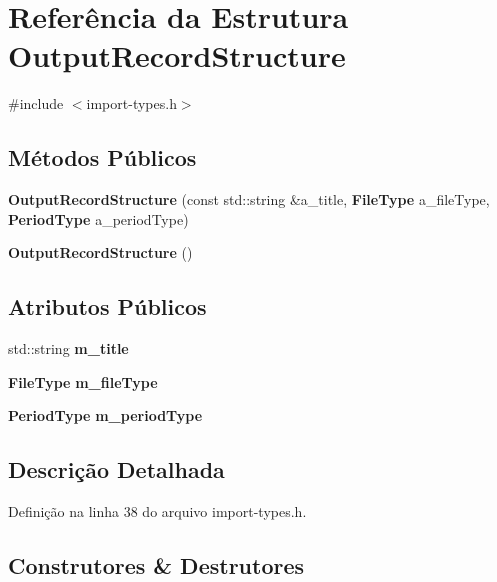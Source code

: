 \section{Referência da Estrutura Output\+Record\+Structure}
\label{struct_output_record_structure}


{\ttfamily \#include $<$import-\/types.\+h$>$}

\subsection*{Métodos Públicos}
\begin{DoxyCompactItemize}
\item 
{\bf Output\+Record\+Structure} (const std\+::string \&a\+\_\+title, {\bf File\+Type} a\+\_\+file\+Type, {\bf Period\+Type} a\+\_\+period\+Type)
\item 
{\bf Output\+Record\+Structure} ()
\end{DoxyCompactItemize}
\subsection*{Atributos Públicos}
\begin{DoxyCompactItemize}
\item 
std\+::string {\bf m\+\_\+title}
\item 
{\bf File\+Type} {\bf m\+\_\+file\+Type}
\item 
{\bf Period\+Type} {\bf m\+\_\+period\+Type}
\end{DoxyCompactItemize}


\subsection{Descrição Detalhada}


Definição na linha 38 do arquivo import-\/types.\+h.



\subsection{Construtores \& Destrutores}

